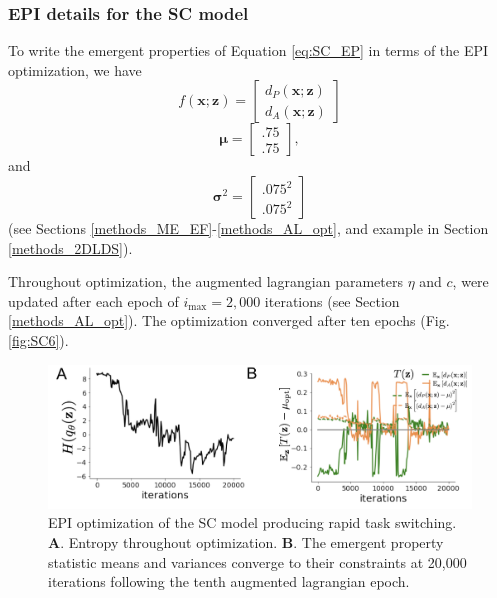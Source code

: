 \documentclass[11pt]{article}
\begin{document}
\subsubsection{EPI details for the SC model} \label{methods_sc_epi}
To write the emergent properties of Equation \ref{eq:SC_EP} in terms of the EPI optimization, we have
\begin{equation} 
f(\mathbf{x}; \mathbf{z}) = \begin{bmatrix} d_P(\mathbf{x}; \mathbf{z}) \\ d_A(\mathbf{x}; \mathbf{z}) \end{bmatrix}
\end{equation}
\begin{equation} 
\bm{\mu} = \begin{bmatrix} .75 \\ .75 \end{bmatrix},
\end{equation}
and
\begin{equation} 
\bm{\sigma}^2 = \begin{bmatrix} .075^2 \\ .075^2 \end{bmatrix}
\end{equation}
(see Sections \ref{methods_ME_EF}-\ref{methods_AL_opt}, and example in Section \ref{methods_2DLDS}).

Throughout optimization, the augmented lagrangian parameters $\eta$ and $c$, were updated after each epoch of $i_{\text{max}} = 2,000$ iterations (see Section \ref{methods_AL_opt}).  
The optimization converged after ten epochs (Fig. \ref{fig:SC6}).


\begin{figure}
\begin{center}
\includegraphics[scale=0.5]{figures/figSC7/figSC7.pdf}
\end{center}
\caption{EPI optimization of the SC model producing rapid task switching.
\textbf{A}. Entropy throughout optimization. 
\textbf{B}. The emergent property statistic means and variances converge to their constraints at 20,000 iterations following the tenth augmented lagrangian epoch.
}
\label{fig:SC7}
\end{figure}
\end{document}
